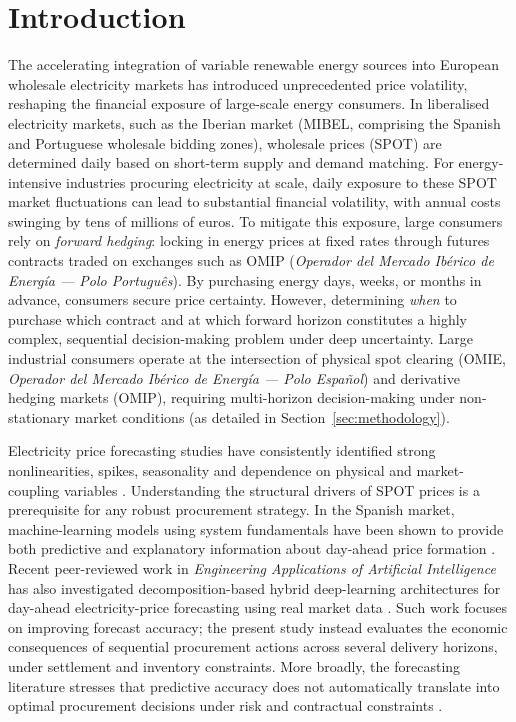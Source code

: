 \section{Introduction}
\label{sec:introduction}

The accelerating integration of variable renewable energy sources into European
wholesale electricity markets has introduced unprecedented price volatility,
reshaping the financial exposure of large-scale energy consumers.
In liberalised electricity markets, such as the Iberian market (MIBEL, comprising the Spanish and Portuguese wholesale bidding zones), wholesale 
prices (SPOT) are determined daily based on short-term supply and demand matching. 
For energy-intensive industries procuring electricity at scale, daily exposure to 
these SPOT market fluctuations can lead to substantial financial volatility, with annual 
costs swinging by tens of millions of euros.
To mitigate this exposure, large consumers rely on \textit{forward hedging}: locking 
in energy prices at fixed rates through futures contracts traded on exchanges such as 
OMIP (\textit{Operador del Mercado Ib{\'e}rico de Energ{\'i}a --- Polo Portugu{\^e}s}). By purchasing energy days, weeks, or 
months in advance, consumers secure price certainty. However, determining \textit{when} 
to purchase which contract and at which forward horizon constitutes a highly complex, 
sequential decision-making problem under deep uncertainty. Large industrial consumers operate at the intersection of physical spot clearing (OMIE, \textit{Operador del Mercado Ib\'erico de Energ\'ia --- Polo Espa\~nol}) and derivative hedging markets (OMIP), requiring multi-horizon decision-making under non-stationary market conditions (as detailed in Section~\ref{sec:methodology}).

Electricity price forecasting studies have consistently identified strong nonlinearities, spikes, seasonality and dependence on physical and market-coupling variables \cite{weron2014electricity, li2021dayahead}.
Understanding the structural drivers of SPOT prices is a prerequisite for any 
robust procurement strategy. In the Spanish market, machine-learning models using system fundamentals have been shown to provide both predictive and explanatory information about day-ahead price formation \cite{diaz2019prediction}. 
Recent peer-reviewed work in \textit{Engineering Applications of Artificial Intelligence} has also investigated decomposition-based hybrid deep-learning architectures for day-ahead electricity-price forecasting using real market data \cite{aksu2026dayahead}. Such work focuses on improving forecast accuracy; the present study instead evaluates the economic consequences of sequential procurement actions across several delivery horizons, under settlement and inventory constraints. 
More broadly, the forecasting literature stresses that predictive accuracy does not automatically translate into optimal procurement decisions under risk and contractual constraints \cite{weron2014electricity, hanetho2023commodities}.

